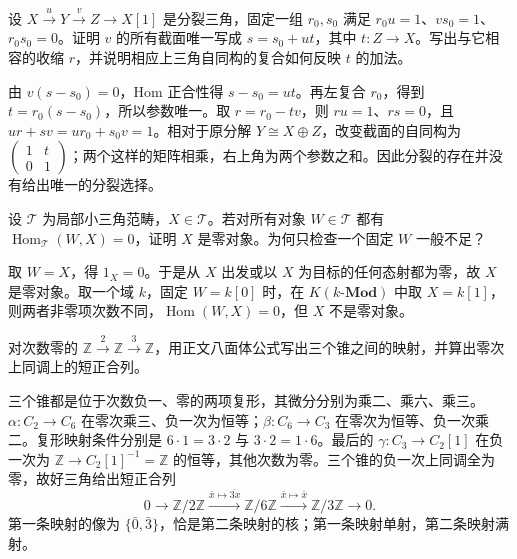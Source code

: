 \begin{exercise}\label{b4:ex:16-split-triangle}
	设 \(X\xrightarrow{u}Y\xrightarrow{v}Z\to X[1]\) 是分裂三角，固定一组 \(r_0,s_0\) 满足 \(r_0u=1\)、\(vs_0=1\)、\(r_0s_0=0\)。证明 \(v\) 的所有截面唯一写成 \(s=s_0+ut\)，其中 \(t:Z\to X\)。写出与它相容的收缩 \(r\)，并说明相应上三角自同构的复合如何反映 \(t\) 的加法。
\end{exercise}
\begin{solution}
	由 \(v(s-s_0)=0\)，Hom 正合性得 \(s-s_0=ut\)。再左复合 \(r_0\)，得到 \(t=r_0(s-s_0)\)，所以参数唯一。取 \(r=r_0-tv\)，则 \(ru=1\)、\(rs=0\)，且 \(ur+sv=ur_0+s_0v=1\)。相对于原分解 \(Y\cong X\oplus Z\)，改变截面的自同构为 \(\left(\begin{smallmatrix}1&t\\0&1\end{smallmatrix}\right)\)；两个这样的矩阵相乘，右上角为两个参数之和。因此分裂的存在并没有给出唯一的分裂选择。
\end{solution}

\begin{exercise}\label{b4:ex:16-detect-zero}
	设 \(\mathcal T\) 为局部小三角范畴，\(X\in\mathcal T\)。若对所有对象 \(W\in\mathcal T\) 都有 \(\operatorname{Hom}_{\mathcal T}(W,X)=0\)，证明 \(X\) 是零对象。为何只检查一个固定 \(W\) 一般不足？
\end{exercise}
\begin{solution}
	取 \(W=X\)，得 \(1_X=0\)。于是从 \(X\) 出发或以 \(X\) 为目标的任何态射都为零，故 \(X\) 是零对象。取一个域 \(k\)，固定 \(W=k[0]\) 时，在 \(K(k\text{-}\mathbf{Mod})\) 中取 \(X=k[1]\)，则两者非零项次数不同，\(\operatorname{Hom}(W,X)=0\)，但 \(X\) 不是零对象。
\end{solution}

\begin{exercise}\label{b4:ex:16-octa-integers}
	对次数零的 \(\mathbb Z\xrightarrow{2}\mathbb Z\xrightarrow{3}\mathbb Z\)，用正文八面体公式写出三个锥之间的映射，并算出零次上同调上的短正合列。
\end{exercise}
\begin{solution}
	三个锥都是位于次数负一、零的两项复形，其微分分别为乘二、乘六、乘三。\(\alpha:C_2\to C_6\) 在零次乘三、负一次为恒等；\(\beta:C_6\to C_3\) 在零次为恒等、负一次乘二。复形映射条件分别是 \(6\cdot1=3\cdot2\) 与 \(3\cdot2=1\cdot6\)。最后的 \(\gamma:C_3\to C_2[1]\) 在负一次为 \(\mathbb Z\to C_2[1]^{-1}=\mathbb Z\) 的恒等，其他次数为零。三个锥的负一次上同调全为零，故好三角给出短正合列
	\[
		0\longrightarrow\mathbb Z/2\mathbb Z \xrightarrow{\bar x\mapsto\overline{3x}}\mathbb Z/6\mathbb Z \xrightarrow{\bar x\mapsto\bar x}\mathbb Z/3\mathbb Z \longrightarrow0.
	\]
	第一条映射的像为 \(\{\bar0,\bar3\}\)，恰是第二条映射的核；第一条映射单射，第二条映射满射。
\end{solution}

